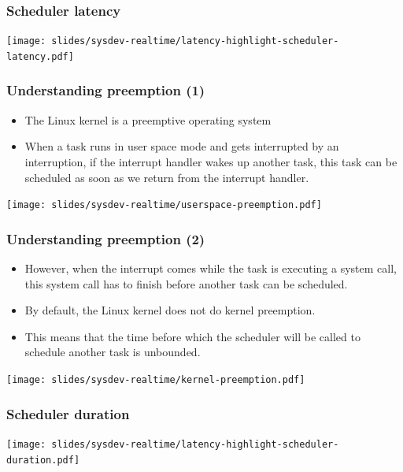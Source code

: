 \begin{frame}
  \frametitle{Scheduler latency}
  \begin{center}
    \texttt{[image: slides/sysdev-realtime/latency-highlight-scheduler-latency.pdf]}
  \end{center}
\end{frame}

\begin{frame}
  \frametitle{Understanding preemption (1)}
  \begin{itemize}
  \item The Linux kernel is a preemptive operating system
  \item When a task runs in user space mode and gets interrupted by an
    interruption, if the interrupt handler wakes up another task, this
    task can be scheduled as soon as we return from the interrupt
    handler.
  \end{itemize}
  \begin{center}
    \texttt{[image: slides/sysdev-realtime/userspace-preemption.pdf]}
  \end{center}
\end{frame}

\begin{frame}
  \frametitle{Understanding preemption (2)}
  \begin{itemize}
  \item However, when the interrupt comes while the task is executing
    a system call, this system call has to finish before another task
    can be scheduled.
  \item By default, the Linux kernel does not do kernel preemption.
  \item This means that the time before which the scheduler will be
    called to schedule another task is unbounded.
  \end{itemize}
  \begin{center}
    \texttt{[image: slides/sysdev-realtime/kernel-preemption.pdf]}
  \end{center}
\end{frame}

\begin{frame}
\frametitle{Scheduler duration}
  \begin{center}
    \texttt{[image: slides/sysdev-realtime/latency-highlight-scheduler-duration.pdf]}
  \end{center}
\end{frame}

